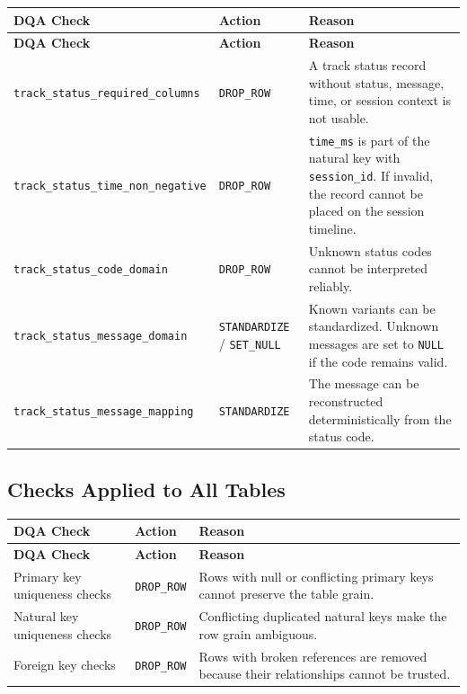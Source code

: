 \documentclass[a4paper,11pt]{article}
\begin{document}
	\begin{longtable}{p{6cm}p{2.5cm}p{6.4cm}}
		\toprule
		\textbf{DQA Check} & \textbf{Action} & \textbf{Reason} \\
		\midrule
		\endfirsthead
		
		\toprule
		\textbf{DQA Check} & \textbf{Action} & \textbf{Reason} \\
		\midrule
		\endhead
		
		\texttt{track\_status\_required\_columns}
		& \texttt{DROP\_ROW}
		& A track status record without status, message, time, or session context is not usable. \\
		\midrule
		
		\texttt{track\_status\_time\_non\_negative}
		& \texttt{DROP\_ROW}
		& \texttt{time\_ms} is part of the natural key with \texttt{session\_id}. If invalid, the record cannot be placed on the session timeline. \\
		\midrule
		
		\texttt{track\_status\_code\_domain}
		& \texttt{DROP\_ROW}
		& Unknown status codes cannot be interpreted reliably. \\
		\midrule
		
		\texttt{track\_status\_message\_domain}
		& \texttt{STANDARDIZE} / \texttt{SET\_NULL}
		& Known variants can be standardized. Unknown messages are set to \texttt{NULL} if the code remains valid. \\
		\midrule
		
		\texttt{track\_status\_message\_mapping}
		& \texttt{STANDARDIZE}
		& The message can be reconstructed deterministically from the status code. \\
		\bottomrule
	\end{longtable}
	
	\subsection{Checks Applied to All Tables}
	
	\begin{longtable}{p{5.6cm}p{3cm}p{6.4cm}}
		\toprule
		\textbf{DQA Check} & \textbf{Action} & \textbf{Reason} \\
		\midrule
		\endfirsthead
		
		\toprule
		\textbf{DQA Check} & \textbf{Action} & \textbf{Reason} \\
		\midrule
		\endhead
		
		Primary key uniqueness checks
		& \texttt{DROP\_ROW}
		& Rows with null or conflicting primary keys cannot preserve the table grain. \\
		\midrule
		
		Natural key uniqueness checks
		& \texttt{DROP\_ROW}
		& Conflicting duplicated natural keys make the row grain ambiguous. \\
		\midrule
		
		Foreign key checks
		& \texttt{DROP\_ROW}
		& Rows with broken references are removed because their relationships cannot be trusted. \\
		\bottomrule
	\end{longtable}
	
\end{document}
